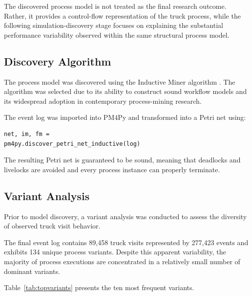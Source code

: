 The discovered process model is not treated as the final research outcome. Rather, it provides a control-flow representation of the truck process, while the following simulation-discovery stage focuses on explaining the substantial performance variability observed within the same structural process model.

\subsection{Discovery Algorithm}

The process model was discovered using the Inductive Miner algorithm \cite{leemans2013discovering}. The algorithm was selected due to its ability to construct sound workflow models and its widespread adoption in contemporary process-mining research.

The event log was imported into PM4Py and transformed into a Petri net using:

\begin{verbatim}
net, im, fm =
pm4py.discover_petri_net_inductive(log)
\end{verbatim}

The resulting Petri net is guaranteed to be sound, meaning that deadlocks and livelocks are avoided and every process instance can properly terminate.

\subsection{Variant Analysis}

Prior to model discovery, a variant analysis was conducted to assess the diversity of observed truck visit behavior.

The final event log contains 89,458 truck visits represented by 277,423 events and exhibits 134 unique process variants. Despite this apparent variability, the majority of process executions are concentrated in a relatively small number of dominant variants.

Table~\ref{tab:topvariants} presents the ten most frequent variants.

